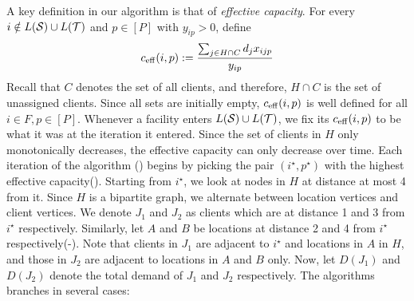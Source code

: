 \noindent
A key definition in our algorithm is that of {\em effective capacity}. For every $i\notin L({\cal S})\cup L({\cal T})$ and $p\in [P]$ with $y_{ip} > 0$, define
\[
c_{\mathrm{eff}}(i,p) := \frac{\sum_{j\in H \cap C} d_j x_{ijp}}{y_{ip}}
\]
Recall that $C$ denotes the set of all clients, and therefore, $H \cap C$ is the set of unassigned clients.
Since all sets
 are initially empty, $c_{\mathrm{eff}}(i,p)$ is well defined for all $i\in F, p\in [P]$. Whenever a facility enters $L({\cal S})\cup L({\cal T})$, we fix its $c_{\mathrm{eff}}(i,p)$ to be what it was at the iteration it entered.
Since the set of clients in $H$ only monotonically decreases, the effective capacity can only decrease over time. Each iteration of the algorithm () begins by picking the pair $(i^\star, p^\star)$ with the highest
effective capacity(). Starting from $i^\star$, we look at nodes in $H$ at distance at most 4 from it. Since
$H$ is a bipartite graph, we alternate between location vertices and client vertices. We denote $J_1$ and $J_2$ as clients which are at distance 1 and 3 from $i^\star$ respectively. Similarly, let $A$ and $B$ be locations at distance 2 and 4 from $i^\star$ respectively(-). Note that clients in $J_1$ are adjacent to $i^\star$ and locations in $A$ in $H$, and those in $J_2$ are adjacent to locations in $A$ and $B$ only. Now, let $D(J_1)$ and $D(J_2)$ denote the
total demand of $J_1$ and $J_2$ respectively. The algorithms branches in several cases:
